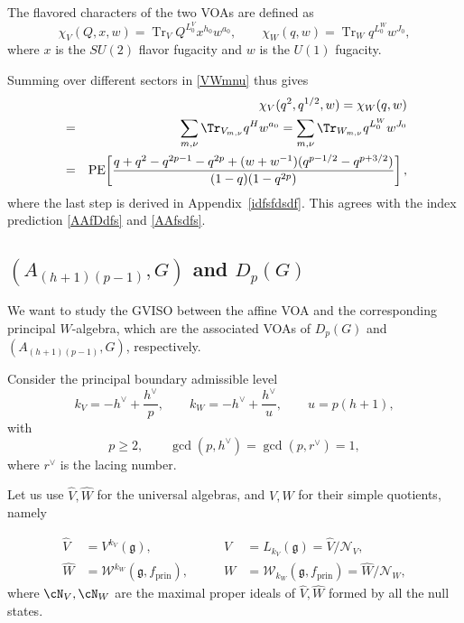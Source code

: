 \documentclass[a4paper,11pt]{article}
\theoremstyle{definition}
\theoremstyle{definition}
\theoremstyle{remark}
\newcommand{\be}{\begin{equation}}
\newcommand{\ee}{\end{equation}}
\newcommand{\beqn}{\begin{eqnarray}}
\newcommand{\eeqn}{\end{eqnarray}}
\begin{document}
 


The  flavored characters of the two VOAs are defined as
  \be
 \chi_V(Q,x,w)=\operatorname{Tr}_{V}Q^{L_0^V}x^{h_0}w^{a_0},
\qquad \chi_W(q,w)=\operatorname{Tr}_{W}q^{L_0^W}w^{J_0},
\ee 
where $x$ is the $SU(2)$ flavor fugacity and $w$ is the $U(1)$ fugacity. 

 Summing over different sectors in \eqref{VWmnu} thus gives 
\beqn
&&\chi_{V}(q^2,q^{1/2},w)=\chi_{W}(q,w)
\nonumber\\&=&
 \sum_{m,\nu}\Tr_{V_{m,\nu}}q^Hw^{a_0}
=\sum_{m,\nu}\Tr_{W_{m,\nu}}q^{L_0^W}w^{J_0}
\nonumber\\&=&
\operatorname{PE}\!\left[
\frac{q+q^2-q^{2p-1}-q^{2p}
 +(w+w^{-1})(q^{p-1/2}-q^{p+3/2})}
 {(1-q)(1-q^{2p})}\right],
\eeqn
where the last step is derived in Appendix~\ref{idfsfdsdf}.  This agrees with the index  prediction \eqref{AAfDdfs} and  \eqref{AAfsdfs}.

 

\subsection{$(A_{(h+1)(p-1)},G)$ and $D_p(G)$}
 
 We want to study the GVISO between the  affine VOA and   the corresponding principal
$W$-algebra, which are the associated VOAs of     $D_p(G)$ and $(A_{(h+1)(p-1)},G)$, respectively.
 
 Consider the principal boundary admissible level
\be\label{kvwpsf}
k_V=-h^\vee+\frac{h^\vee}{p},
\qquad
k_W=-h^\vee+\frac{h^\vee}{u},
\qquad
u=p(h+1),
\ee
with
\be
p\ge2,\qquad
\gcd(p,h^\vee)=\gcd(p,r^\vee)=1,
\ee
where $ r^\vee$ is the lacing number.


 Let us use   $ \widehat V,\widehat W$ for  the universal algebras, and $ V,W$ for their simple quotients, namely


\be
\begin{aligned}
\widehat V &=  V^{k_V}(\mathfrak g),
\qquad
&V &=  L_{k_V}(\mathfrak g)
=\widehat V/\mathcal N_V,
\nonumber\\
\widehat W &=  \mathcal W^{k_W}(\mathfrak g,f_{\mathrm{prin}}),
\qquad
&W &= \mathcal W_{k_W}(\mathfrak g,f_{\mathrm{prin}})
=\widehat W/\mathcal N_W,
\end{aligned}
\ee
where $\cN_V,\cN_W$ are the maximal proper ideals of $\widehat V,\widehat W$ formed by all the null states.
 
\end{document}
